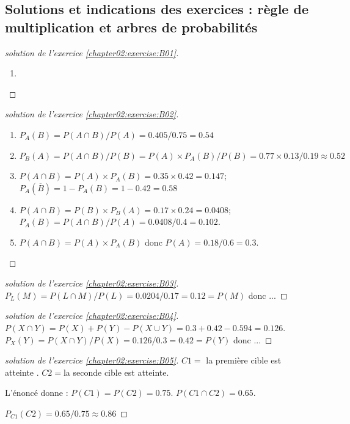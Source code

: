 \documentclass[main.tex]{subfiles}
\begin{document}
\subsection{Solutions et indications des exercices : règle de multiplication et arbres de probabilités}



\begin{proof}[solution de l'exercice \ref{chapter02:exercise:B01}]\hfill 
	\begin{enumerate}[leftmargin=*,label=\arabic*)]
		\item  
	\end{enumerate} 
\end{proof} 



\begin{proof}[solution de l'exercice \ref{chapter02:exercise:B02}]\hfill  
	\begin{enumerate}[leftmargin=*,label=\arabic*)]
	\item $P_A(B)=P(A\cap B)/P(A)=0.405/0.75=0.54$
	\item $P_B(A)=P(A\cap B)/P(B)=P(A)\times P_A(B)/P(B)=0.77\times 0.13/0.19\approx 0.52$
	\item $P(A\cap B)=P(A)\times P_A(B)=0.35\times 0.42=0.147$; $P_A(\overline{B})=1-P_A(B)=1-0.42=0.58$
	\item $P(A\cap B)=P(B)\times P_B(A)=0.17\times 0.24=0.0408$; $P_A(B)=P(A\cap B)/P(A)=0.0408/0.4=0.102$.
	\item $P(A\cap B)=P(A)\times P_A(B)$ donc $P(A)=0.18/0.6=0.3$.
\end{enumerate} 

\end{proof} 



\begin{proof}[solution de l'exercice \ref{chapter02:exercise:B03}]\hfill 

$P_L(M)=P(L\cap M)/P(L)=0.0204/0.17=0.12=P(M)$ donc ...

\end{proof} 


\begin{proof}[solution de l'exercice \ref{chapter02:exercise:B04}]\hfill 

$P(X\cap Y)=P(X)+P(Y)-P(X\cup Y)=0.3+0.42-0.594=0.126$. $P_X(Y)=P(X\cap Y)/P(X)=0.126/0.3=0.42=P(Y)$ donc ...
\end{proof} 


\begin{proof}[solution de l'exercice \ref{chapter02:exercise:B05}]\hfill 

$C1=$ \og la première cible est atteinte \fg{}. $C2=$\og la seconde cible est atteinte\fg{}.

L'énoncé donne : $P(C1)=P(C2)=0.75$. $P(C1\cap C2)=0.65$. 

$P_{C1}(C2)=0.65/0.75\approx 0.86$
\end{proof} 
\end{document}
